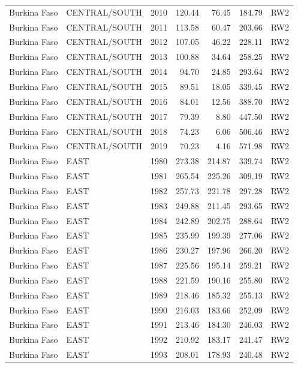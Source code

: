\begin{longtable}{lllrrrl}
  Burkina Faso & CENTRAL/SOUTH & 2010 & 120.44 & 76.45 & 184.79 & RW2 \\ 
  Burkina Faso & CENTRAL/SOUTH & 2011 & 113.58 & 60.47 & 203.66 & RW2 \\ 
  Burkina Faso & CENTRAL/SOUTH & 2012 & 107.05 & 46.22 & 228.11 & RW2 \\ 
  Burkina Faso & CENTRAL/SOUTH & 2013 & 100.88 & 34.64 & 258.25 & RW2 \\ 
  Burkina Faso & CENTRAL/SOUTH & 2014 & 94.70 & 24.85 & 293.64 & RW2 \\ 
  Burkina Faso & CENTRAL/SOUTH & 2015 & 89.51 & 18.05 & 339.45 & RW2 \\ 
  Burkina Faso & CENTRAL/SOUTH & 2016 & 84.01 & 12.56 & 388.70 & RW2 \\ 
  Burkina Faso & CENTRAL/SOUTH & 2017 & 79.39 & 8.80 & 447.50 & RW2 \\ 
  Burkina Faso & CENTRAL/SOUTH & 2018 & 74.23 & 6.06 & 506.46 & RW2 \\ 
  Burkina Faso & CENTRAL/SOUTH & 2019 & 70.23 & 4.16 & 571.98 & RW2 \\ 
  Burkina Faso & EAST & 1980 & 273.38 & 214.87 & 339.74 & RW2 \\ 
  Burkina Faso & EAST & 1981 & 265.54 & 225.26 & 309.19 & RW2 \\ 
  Burkina Faso & EAST & 1982 & 257.73 & 221.78 & 297.28 & RW2 \\ 
  Burkina Faso & EAST & 1983 & 249.88 & 211.45 & 293.65 & RW2 \\ 
  Burkina Faso & EAST & 1984 & 242.89 & 202.75 & 288.64 & RW2 \\ 
  Burkina Faso & EAST & 1985 & 235.99 & 199.39 & 277.06 & RW2 \\ 
  Burkina Faso & EAST & 1986 & 230.27 & 197.96 & 266.20 & RW2 \\ 
  Burkina Faso & EAST & 1987 & 225.56 & 195.14 & 259.21 & RW2 \\ 
  Burkina Faso & EAST & 1988 & 221.59 & 190.16 & 255.80 & RW2 \\ 
  Burkina Faso & EAST & 1989 & 218.46 & 185.32 & 255.13 & RW2 \\ 
  Burkina Faso & EAST & 1990 & 216.03 & 183.66 & 252.09 & RW2 \\ 
  Burkina Faso & EAST & 1991 & 213.46 & 184.30 & 246.03 & RW2 \\ 
  Burkina Faso & EAST & 1992 & 210.92 & 183.17 & 241.47 & RW2 \\ 
  Burkina Faso & EAST & 1993 & 208.01 & 178.93 & 240.48 & RW2 \\ 

\end{longtable}
